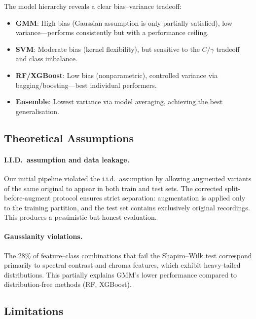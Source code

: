 \documentclass[11pt,a4paper]{article}
\begin{document}
The model hierarchy reveals a clear bias--variance tradeoff:
\begin{itemize}[nosep]
  \item \textbf{GMM}: High bias (Gaussian assumption is only partially
        satisfied), low variance---performs consistently but with a
        performance ceiling.
  \item \textbf{SVM}: Moderate bias (kernel flexibility), but
        sensitive to the $C/\gamma$ tradeoff and class imbalance.
  \item \textbf{RF/XGBoost}: Low bias (nonparametric), controlled
        variance via bagging/boosting---best individual performers.
  \item \textbf{Ensemble}: Lowest variance via model averaging,
        achieving the best generalisation.
\end{itemize}

\subsection{Theoretical Assumptions}

\paragraph{I.I.D.\ assumption and data leakage.}
Our initial pipeline violated the i.i.d.\ assumption by allowing
augmented variants of the same original to appear in both train and
test sets. The corrected split-before-augment protocol ensures
strict separation: augmentation is applied only to the training
partition, and the test set contains exclusively original recordings.
This produces a pessimistic but honest evaluation.

\paragraph{Gaussianity violations.}
The 28\% of feature--class combinations that fail the Shapiro--Wilk
test correspond primarily to spectral contrast and chroma features,
which exhibit heavy-tailed distributions. This partially explains
GMM's lower performance compared to distribution-free methods (RF,
XGBoost).

\subsection{Limitations}
\end{document}
